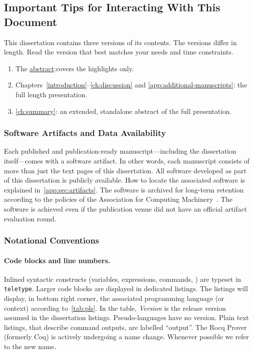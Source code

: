 \subsection{Important Tips for Interacting With This Document}
\label{subsec:tips}

This dissertation contains three versions of its contents.
The versions differ in length.
Read the version that best matches your needs and time constraints.

\begin{mdframed}[backgroundcolor=priorbase,linecolor=cc]
\begin{enumerate}[wide, labelwidth=!, labelindent=0pt]
\item The \hyperref[abs]{abstract}:covers the highlights only.
\item Chapters~\ref{introduction}--\ref{ch:discussion} and \ref{app:additional-manuscripts}: the full length presentation.
\item \autoref{ch:summary}: an extended, standalone abstract of the full presentation.
\end{enumerate}
\end{mdframed}

\subsubsection{Software Artifacts and Data Availability}

Each published and publication-ready manuscript---including the dissertation itself---comes with a software artifact.
In other words, each manuscript consists of more than {just the text pages} of this dissertation.
All software developed as part of this dissertation is publicly available.
How to locate the associated software is explained in~\autoref{app:sec:artifacts}.
The software is archived for long-term retention according to the policies of the Association for Computing Machinery~\cite{acm_badging}.
The software is achieved even if the publication venue did not have an official artifact evaluation round.

\subsubsection{Notational Conventions}

\paragraph*{Code blocks and line numbers.}
Inlined syntactic constructs (variables, expressions, commands, \etc) are typeset in \texttt{teletype}.
Larger code blocks are displayed in dedicated listings.
The listings will display, in bottom right corner, the associated programming language (or context) according to~\autoref{tab:pls}.
In the table, \emph{Version} is the release version assumed in the dissertation listings.
Pseudo-languages have no version.
Plain text listings, that describe command outputs, are labelled \enquote{output}.
The Rocq Prover (formerly Coq) is actively undergoing a name change.
Whenever possible we refer to the new name.

